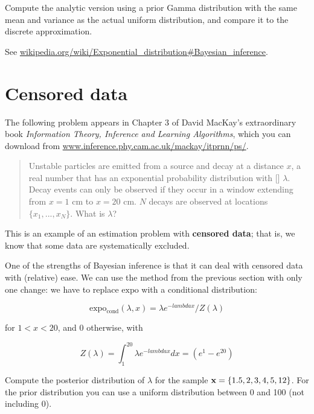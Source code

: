 \documentclass[12pt]{book}
\begin{document}
\begin{ex}

Compute the analytic version using a prior Gamma distribution with the
same mean and variance as the actual uniform distribution, and compare
it to the discrete approximation.

See \url{wikipedia.org/wiki/Exponential_distribution#Bayesian_inference}.

\end{ex}


\section{Censored data}

The following problem appears in Chapter 3 of David MacKay's
extraordinary book {\em Information Theory, Inference and Learning
  Algorithms}, which you can download from
\url{www.inference.phy.cam.ac.uk/mackay/itprnn/ps/}.

\begin{quote}

Unstable particles are emitted from a source and decay at a distance $x$,
a real number that has an exponential probability distribution with
[] $\lambda$.  Decay events can only be observed if they
occur in a window extending from $x=1$ cm to $x=20$ cm.  $N$ decays are
observed at locations $\{ x_1, ... , x_N \}$.  What is $\lambda$? 

\end{quote}

This is an example of an estimation problem with {\bf censored data};
that is, we know that some data are systematically excluded.

One of the strengths of Bayesian inference is that it can deal with
censored data with (relative) ease.  We can use the method from the
previous section with only one change: we have to replace
$\mathrm{expo}$ with a conditional distribution:

\[ \mathrm{expo_{cond}}(\lambda, x) = \lambda e^{-lambda x} / Z(\lambda)  \]

for $1 < x < 20$, and 0 otherwise, with

\[ Z(\lambda) = \int_1^{20} \lambda e^{-lambda x} dx = (e^{1} - e^{20} ) \]

\begin{ex}

Compute the posterior distribution of $\lambda$ for the sample
$\mathbf{x} = \{ 1.5, 2, 3, 4, 5, 12 \}$.  For the prior distribution you
can use a uniform distribution between 0 and 100 (not including 0).

\end{ex}
\end{document}
